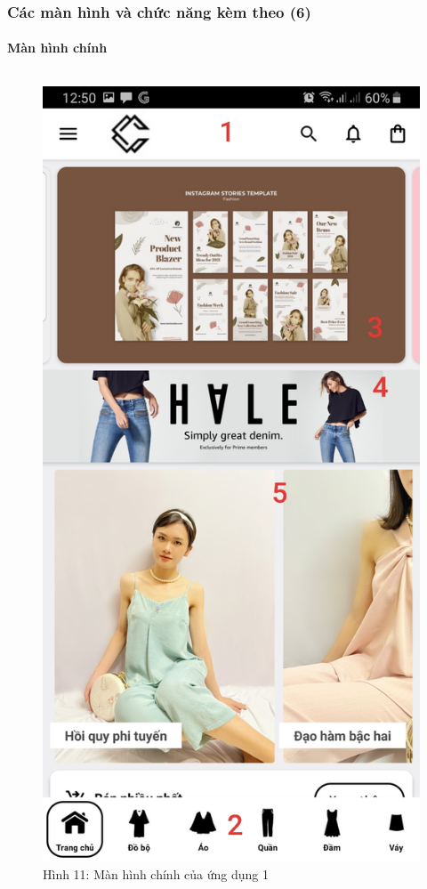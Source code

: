 \documentclass{beamer}
\begin{document}
\begin{frame}
    \frametitle{Các màn hình và chức năng kèm theo (6)}
    \framesubtitle{Màn hình chính}

    \begin{columns}
        \begin{figure}
            \centering
            \includegraphics[height=0.7\textheight]{images/06.png}
            \caption{\centering\tiny{Hình 11: Màn hình chính của ứng dụng 1}}


\end{figure}
\end{columns}
\end{frame}
\end{document}
